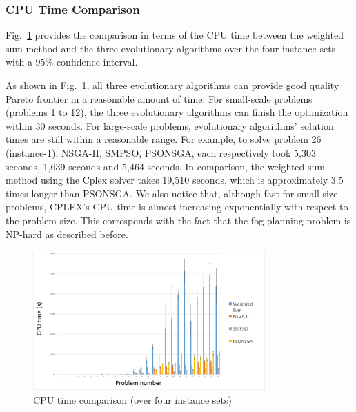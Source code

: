 \documentclass[10pt,journal,compsoc]{IEEEtran}
\newcommand{\Fig}[1]{Fig.~\ref{#1}}
\begin{document}
\subsubsection{CPU Time Comparison}
\Fig{cputimeover4} provides the comparison in terms of the CPU time between the weighted sum method and the three evolutionary algorithms over the four instance sets with a 95\% confidence interval. 

As shown in \Fig{cputimeover4}, all three evolutionary algorithms can provide good quality Pareto frontier in a reasonable amount of time. For small-scale problems (problems 1 to 12), the three evolutionary algorithms can finish the optimization within 30 seconds. For large-scale problems, evolutionary algorithms' solution times are still within a reasonable range. For example, to solve problem 26 (instance-1), NSGA-II, SMPSO, PSONSGA, each respectively took 5,303 seconds, 1,639 seconds and 5,464 seconds. In comparison, the weighted sum method using the Cplex solver takes 19,510 seconds, which is approximately 3.5 times longer than PSONSGA. We also notice that, although fast for small size problems, CPLEX's CPU time is almost increasing exponentially with respect to the problem size. This corresponds with the fact that the fog planning problem is NP-hard as described before.

\begin{figure}[h]
\centerline{\includegraphics[page=1,width=3.5in]{cputimeover4}}
\caption{CPU time comparison (over four instance sets)} 
\label{cputimeover4}
\end{figure}
\end{document}
